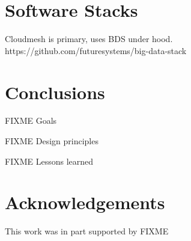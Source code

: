 \documentclass[9pt,twocolumn,twoside]{styles/osajnl}
\begin{document}
	

	

	





\section{Software Stacks}

Cloudmesh is primary, uses BDS under hood.
https://github.com/futuresystems/big-data-stack


\section{Conclusions}

FIXME Goals


FIXME Design principles


FIXME Lessons learned




\section*{Acknowledgements}

This work was in part supported by FIXME




 
\end{document}
